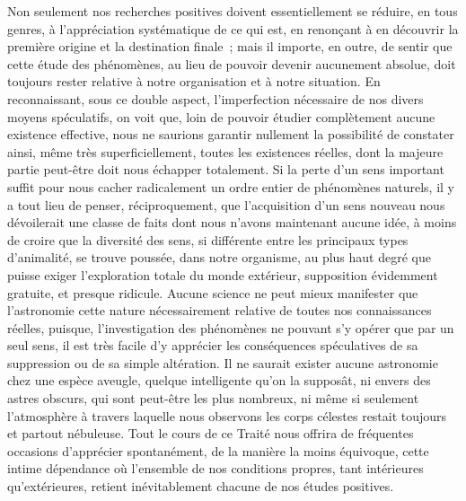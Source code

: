 \documentclass[french,twoside]{book} %
\begin{document}
Non seulement nos recherches positives doivent essentiellement se réduire, en tous genres, à l’appréciation systématique de ce qui est, en renonçant à en découvrir la première origine et la destination finale ; mais il importe, en outre, de sentir que cette étude des phénomènes, au lieu de pouvoir devenir aucunement absolue, doit toujours rester relative à notre organisation et à notre situation. En reconnaissant, sous ce double aspect, l’imperfection nécessaire de nos divers moyens spéculatifs, on voit que, loin de pouvoir étudier complètement aucune existence effective, nous ne saurions garantir nullement la possibilité de constater ainsi, même très superficiellement, toutes les existences réelles, dont la majeure partie peut-être doit nous échapper totalement. Si la perte d’un sens important suffit pour nous cacher radicalement un ordre entier de phénomènes naturels, il y a tout lieu de penser, réciproquement, que l’acquisition d’un sens nouveau nous dévoilerait une classe de faits dont nous n’avons maintenant aucune idée, à moins de croire que la diversité des sens, si différente entre les principaux types d’animalité, se trouve poussée, dans notre organisme, au plus haut degré que puisse exiger l’exploration totale du monde extérieur, supposition évidemment gratuite, et presque ridicule. Aucune science ne peut mieux manifester que l’astronomie cette nature nécessairement relative de toutes nos connaissances réelles, puisque, l’investigation des phénomènes ne pouvant s’y opérer que par un seul sens, il est très facile d’y apprécier les conséquences spéculatives de sa suppression ou de sa simple altération. Il ne saurait exister aucune astronomie chez une espèce aveugle, quelque intelligente qu’on la supposât, ni envers des astres obscurs, qui sont peut-être les plus nombreux, ni même si seulement l’atmosphère à travers laquelle nous observons les corps célestes restait toujours et partout nébuleuse. Tout le cours de ce Traité nous offrira de fréquentes occasions d’apprécier spontanément, de la manière la moins équivoque, cette intime dépendance où l’ensemble de nos conditions propres, tant intérieures qu’extérieures, retient inévitablement chacune de nos études positives.\par
\end{document}
